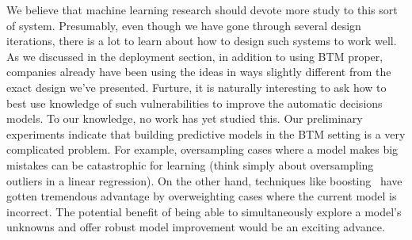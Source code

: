 We believe that machine learning research should devote more study to this sort of system.  Presumably, even though we have gone through several design iterations, there is a lot to learn about how to design such systems to work well.  As we discussed in the deployment section, in addition to using BTM proper, companies already have been using the ideas in ways slightly different from the exact design we've presented. 
Furture, it is naturally interesting to ask how to best use knowledge of such vulnerabilities to improve the automatic decisions models.  To our knowledge, no work has yet studied this.  Our preliminary experiments indicate that building predictive models in the BTM setting is a very complicated problem. For example, oversampling cases where a model makes big mistakes can be catastrophic for  learning (think simply about oversampling outliers in a linear regression). On the other hand, techniques like boosting~\cite{Freund99ashort} have gotten tremendous advantage by overweighting cases where the current model is incorrect. The potential benefit of being able to simultaneously explore a model's unknowns and offer robust model improvement would be an exciting advance.









